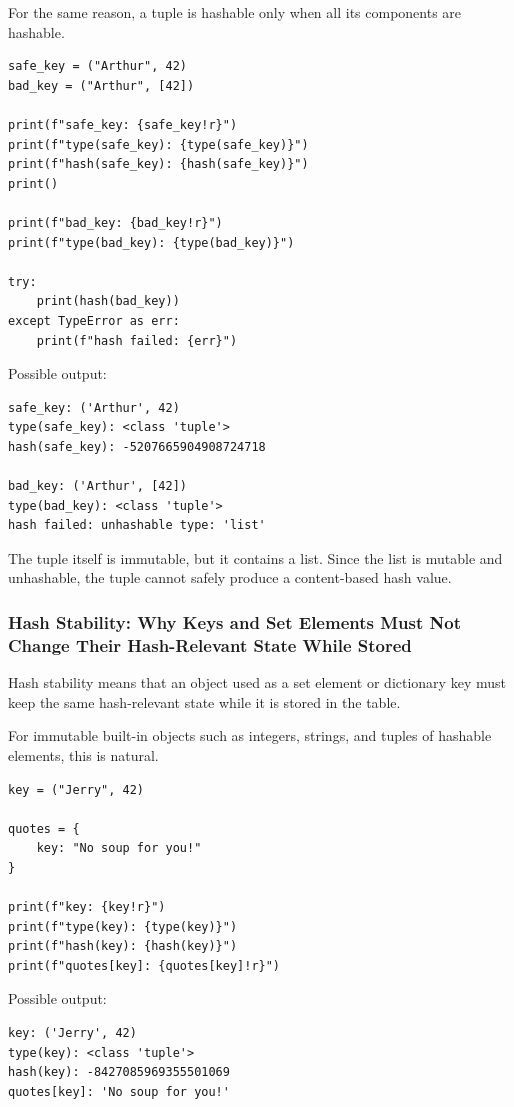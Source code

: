 For the same reason, a tuple is hashable only when all its components are hashable.

\begin{verbatim}
safe_key = ("Arthur", 42)
bad_key = ("Arthur", [42])

print(f"safe_key: {safe_key!r}")
print(f"type(safe_key): {type(safe_key)}")
print(f"hash(safe_key): {hash(safe_key)}")
print()

print(f"bad_key: {bad_key!r}")
print(f"type(bad_key): {type(bad_key)}")

try:
    print(hash(bad_key))
except TypeError as err:
    print(f"hash failed: {err}")
\end{verbatim}

Possible output:

\begin{verbatim}
safe_key: ('Arthur', 42)
type(safe_key): <class 'tuple'>
hash(safe_key): -5207665904908724718

bad_key: ('Arthur', [42])
type(bad_key): <class 'tuple'>
hash failed: unhashable type: 'list'
\end{verbatim}

The tuple itself is immutable, but it contains a list. Since the list is mutable and unhashable, the tuple cannot safely produce a content-based hash value.

\subsubsection{Hash Stability: Why Keys and Set Elements Must Not Change Their Hash-Relevant State While Stored}

Hash stability means that an object used as a set element or dictionary key must keep the same hash-relevant state while it is stored in the table.

For immutable built-in objects such as integers, strings, and tuples of hashable elements, this is natural.

\begin{verbatim}
key = ("Jerry", 42)

quotes = {
    key: "No soup for you!"
}

print(f"key: {key!r}")
print(f"type(key): {type(key)}")
print(f"hash(key): {hash(key)}")
print(f"quotes[key]: {quotes[key]!r}")
\end{verbatim}

Possible output:

\begin{verbatim}
key: ('Jerry', 42)
type(key): <class 'tuple'>
hash(key): -8427085969355501069
quotes[key]: 'No soup for you!'
\end{verbatim}

